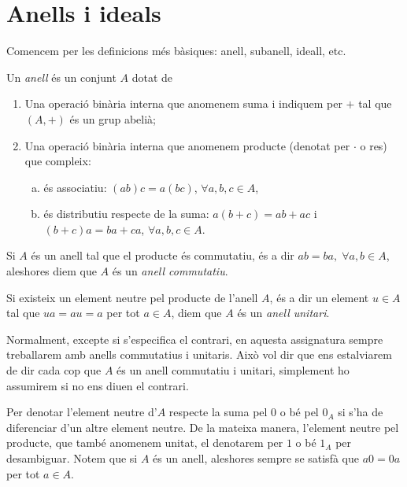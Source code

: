 \documentclass[../main.tex]{subfiles}
\begin{document}
\section{Anells i ideals}

Comencem per les definicions més bàsiques: anell, subanell, ideall, etc.

\begin{defi}
[Anell]\label{def:anell} Un \textit{anell} és un conjunt $A$ dotat de
\begin{enumerate}[(1)]
    \item Una operació binària interna que anomenem suma i indiquem per $+$ tal que $(A,+)$ és un grup abelià;
    \item Una operació binària interna que anomenem producte (denotat per $\cdotp$ o res) que compleix:
    \begin{enumerate}[(a)]
        \item és associatiu: $(ab)c = a(bc)$, $\forall a,b,c\in A$,
        \item és distributiu respecte de la suma: $a(b+c) = ab+ac$ i $(b+c)a = ba+ca$, $\forall a,b,c\in A$.
    \end{enumerate}
\end{enumerate}
\end{defi}

\begin{defi}
\label{def:anellcommutatiu} Si $A$ és un anell tal que el producte és commutatiu, és a dir $ab=ba,\;\forall a,b\in A$, aleshores diem que $A$ és un \textit{anell commutatiu}.
\end{defi}

\begin{defi}
\label{def:anellideal} Si existeix un element neutre pel producte de l'anell $A$, és a dir un element $u\in A$ tal que $ua = au = a$ per tot $a\in A$, diem que $A$ és un \textit{anell unitari}.
\end{defi}

Normalment, excepte si s'especifica el contrari, en aquesta assignatura sempre treballarem amb anells commutatius i unitaris. Això vol dir que ens estalviarem de dir cada cop que $A$ és un anell commutatiu i unitari, simplement ho assumirem si no ens diuen el contrari. 

Per denotar l'element neutre d'$A$ respecte la suma pel $0$ o bé pel $0_A$ si s'ha de diferenciar d'un altre element neutre. De la mateixa manera, l'element neutre pel producte, que també anomenem unitat, el denotarem per $1$ o bé $1_A$ per desambiguar. Notem que si $A$ és un anell, aleshores sempre se satisfà que $a0 = 0a$ per tot $a\in A$.
\end{document}
